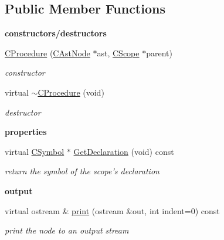 \subsection*{Public Member Functions}
\begin{Indent}{\bf constructors/destructors}\par
\begin{DoxyCompactItemize}
\item 
\hyperlink{classCProcedure_a0bbefc2ae37efca46dcb2f0260bdab6f}{C\-Procedure} (\hyperlink{classCAstNode}{C\-Ast\-Node} $\ast$ast, \hyperlink{classCScope}{C\-Scope} $\ast$parent)
\begin{DoxyCompactList}\small\item\em constructor \end{DoxyCompactList}\item 
\hypertarget{classCProcedure_a8dc7fe1645a3902be0ccbae09d0361fb}{virtual \hyperlink{classCProcedure_a8dc7fe1645a3902be0ccbae09d0361fb}{$\sim$\-C\-Procedure} (void)}\label{classCProcedure_a8dc7fe1645a3902be0ccbae09d0361fb}

\begin{DoxyCompactList}\small\item\em destructor \end{DoxyCompactList}\end{DoxyCompactItemize}
\end{Indent}
\begin{Indent}{\bf properties}\par
\begin{DoxyCompactItemize}
\item 
\hypertarget{classCProcedure_a7cbe3550e66d9fda48b73f1e56b53f22}{virtual \hyperlink{classCSymbol}{C\-Symbol} $\ast$ \hyperlink{classCProcedure_a7cbe3550e66d9fda48b73f1e56b53f22}{Get\-Declaration} (void) const }\label{classCProcedure_a7cbe3550e66d9fda48b73f1e56b53f22}

\begin{DoxyCompactList}\small\item\em return the symbol of the scope's declaration \end{DoxyCompactList}\end{DoxyCompactItemize}
\end{Indent}
\begin{Indent}{\bf output}\par
\begin{DoxyCompactItemize}
\item 
virtual ostream \& \hyperlink{classCProcedure_a579410b1d94780d8f3443f21e1a63542}{print} (ostream \&out, int indent=0) const 
\begin{DoxyCompactList}\small\item\em print the node to an output stream \end{DoxyCompactList}\end{DoxyCompactItemize}
\end{Indent}
